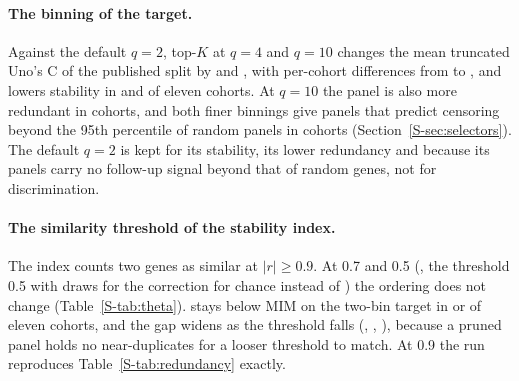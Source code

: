 \paragraph{The binning of the target.} Against the default $q = 2$, top-$K$ at $q = 4$ and
$q = 10$ changes the mean truncated Uno's C of the published split by \SuppQfourC{} and
\SuppQtenC, with per-cohort differences from \SuppQdiffMin{} to \SuppQdiffMax, and lowers
stability in \SuppQfourLessStable{} and \SuppQtenLessStable{} of eleven cohorts. At
$q = 10$ the panel is also more redundant in \SuppQtenMoreRedundant{} cohorts, and both
finer binnings give panels that predict censoring beyond the 95th percentile of random
panels in \SuppCensAboveQfour{} cohorts (Section~\ref{S-sec:selectors}). The default
$q = 2$ is kept for its stability, its lower redundancy and because its panels carry no
follow-up signal beyond that of random genes, not for discrimination.

\paragraph{The similarity threshold of the stability index.} The index counts two genes as
similar at $|r| \ge 0.9$. At 0.7 and 0.5 (, the threshold 0.5
with \SuppThetaDrawsLow{} draws for the correction for chance instead of
\SuppThetaDraws) the ordering does not change (Table~\ref{S-tab:theta}). 
stays below MIM on the two-bin target in \SuppThetaLowerMin{} or \SuppThetaLowerMax{} of
eleven cohorts, and the gap widens as the threshold falls (\SuppThetaGapNine,
\SuppThetaGapSeven, \SuppThetaGapFive), because a pruned panel holds no near-duplicates
for a looser threshold to match. At 0.9 the run reproduces Table~\ref{S-tab:redundancy}
exactly.

\begin{table}[htbp]
\centering\footnotesize
\caption{Matched panel sizes with mRMR and with MIM and mRMR on the two-bin target, and
the redundancy within each panel, as means over the eleven TCGA cohorts and their
protein-coding features, on the published split. : top-$K$ at $q = 2$ unless
stated. Uno's C: truncated. Mean $|r|$: mean absolute Pearson correlation between the
selected genes. $|r| \ge 0.5$: share of gene pairs at or above 0.5. Both are computed on
the training rows of each fold. Null fits: folds, out of 55, in which the downstream model
fell back to the null model.}
\label{S-tab:redundancy}

\end{table}

